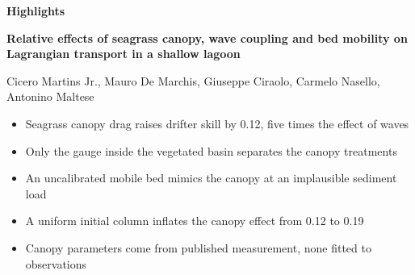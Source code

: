 \documentclass[11pt]{article}
\begin{document}
\begin{center}
{\large\bfseries Highlights}
\end{center}

\vspace{0.4cm}

\textbf{Relative effects of seagrass canopy, wave coupling and bed mobility on Lagrangian transport in a shallow lagoon}

Cicero Martins Jr., Mauro De Marchis, Giuseppe Ciraolo, Carmelo Nasello, Antonino Maltese

\vspace{0.6cm}

\begin{itemize}[leftmargin=1.2em, itemsep=0.5em]
  \item Seagrass canopy drag raises drifter skill by 0.12, five times the effect of waves
  \item Only the gauge inside the vegetated basin separates the canopy treatments
  \item An uncalibrated mobile bed mimics the canopy at an implausible sediment load
  \item A uniform initial column inflates the canopy effect from 0.12 to 0.19
  \item Canopy parameters come from published measurement, none fitted to observations
\end{itemize}
\end{document}
